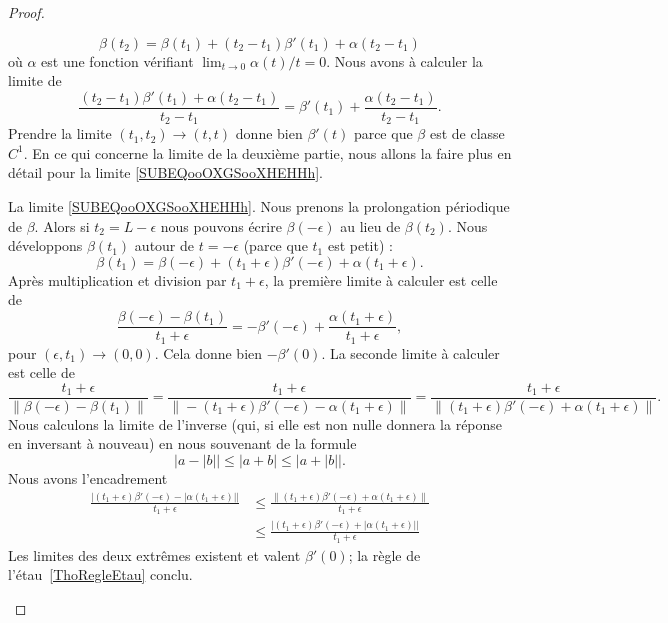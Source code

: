 \begin{proof}
\begin{subproof}
		\begin{equation}
			\beta(t_2)=\beta(t_1)+(t_2-t_1)\beta'(t_1)+\alpha(t_2-t_1)
		\end{equation}
		où \( \alpha\) est une fonction vérifiant \( \lim_{t\to 0}  \alpha(t)/t =0\). Nous avons à calculer la limite de
		\begin{equation}
			\frac{ (t_2-t_1)\beta'(t_1)+\alpha(t_2-t_1) }{ t_2-t_1 }=\beta'(t_1)+\frac{ \alpha(t_2-t_1) }{ t_2-t_1 }.
		\end{equation}
		Prendre la limite \( (t_1,t_2)\to (t,t)\) donne bien \( \beta'(t)\) parce que \( \beta\) est de classe \( C^1\). En ce qui concerne la limite de la deuxième partie, nous allons la faire plus en détail pour la limite \eqref{SUBEQooOXGSooXHEHHh}.

		La limite \eqref{SUBEQooOXGSooXHEHHh}. Nous prenons la prolongation périodique de \( \beta\). Alors si \( t_2=L-\epsilon\) nous pouvons écrire \( \beta(-\epsilon)\) au lieu de \( \beta(t_2)\). Nous développons \( \beta(t_1)\) autour de \( t=-\epsilon\) (parce que \( t_1\) est petit) :
		\begin{equation}
			\beta(t_1)=\beta(-\epsilon)+(t_1+\epsilon)\beta'(-\epsilon)+\alpha(t_1+\epsilon).
		\end{equation}
		Après multiplication et division par \( t_1+\epsilon\), la première limite à calculer est celle de
		\begin{equation}
			\frac{ \beta(-\epsilon)-\beta(t_1) }{ t_1+\epsilon }=-\beta'(-\epsilon)+\frac{ \alpha(t_1+\epsilon) }{ t_1+\epsilon },
		\end{equation}
		pour \( (\epsilon,t_1)\to (0,0)\). Cela donne bien \( -\beta'(0)\). La seconde limite à calculer est celle de
		\begin{equation}
			\frac{ t_1+\epsilon }{ \| \beta(-\epsilon)-\beta(t_1) \| }=\frac{ t_1+\epsilon }{ \| -(t_1+\epsilon)\beta'(-\epsilon)-\alpha(t_1+\epsilon) \| }=\frac{ t_1+\epsilon }{ \| (t_1+\epsilon)\beta'(-\epsilon)+\alpha(t_1+\epsilon) \| }.
		\end{equation}
		Nous calculons la limite de l'inverse (qui, si elle est non nulle donnera la réponse en inversant à nouveau) en nous souvenant de la formule
		\begin{equation}
			\big|  a-| b | \big|  \leq | a+b |\leq \big|    a+| b |\big|.
		\end{equation}
		Nous avons l'encadrement
		\begin{subequations}
			\begin{align}
				\frac{  \big| (t_1+\epsilon)\beta'(-\epsilon)-| \alpha(t_1+\epsilon) | \big| }{ t_1+\epsilon } & \leq \frac{ \|  (t_1+\epsilon)\beta'(-\epsilon)+ \alpha(t_1+\epsilon) \|  }{ t_1+\epsilon }           \\
				                                                                                               & \leq  \frac{ \big|   (t_1+\epsilon)\beta'(-\epsilon)+| \alpha(t_1+\epsilon) | \big| }{ t_1+\epsilon }
			\end{align}
		\end{subequations}
		Les limites des deux extrêmes existent et valent \( \beta'(0)\); la règle de l'étau~\ref{ThoRegleEtau} conclu.


\end{subproof}
\end{proof}
